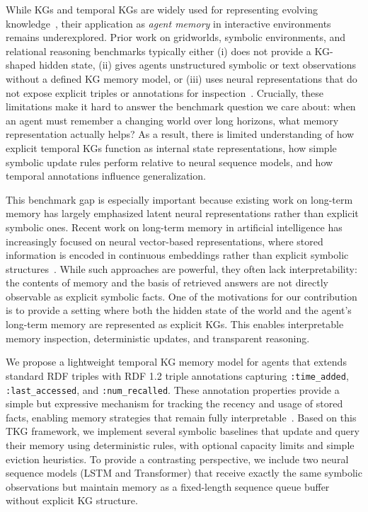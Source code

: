 \documentclass[Afour,sageh,times]{sagej}
\begin{document}
While KGs and temporal KGs are widely used for representing evolving
knowledge~\citep{Hogan_2021,dellaglio2017streamreasoning,moreau2012prov,DBLP:journals/corr/abs-1809-03202},
their application as \emph{agent memory} in interactive environments remains
underexplored. Prior work on gridworlds, symbolic environments, and relational reasoning
benchmarks typically either (i) does not provide a KG-shaped hidden state, (ii) gives
agents unstructured symbolic or text observations without a defined KG memory model, or
(iii) uses neural representations that do not expose explicit triples or annotations for
inspection~\citep{Cote2018TextWorld,Hausknecht2020Jericho,Ammanabrolu2020Graph,10.1609/aaai.v37i1.25075,battaglia2018relationalinductivebiasesdeep,zambaldi2018relationaldeepreinforcementlearning,graves2014neural,graves2016hybrid,Wayne2018MERLIN,DBLP:journals/corr/abs-1803-10122}.
Crucially, these limitations make it hard to answer the benchmark question we care
about: when an agent must remember a changing world over long horizons, what memory
representation actually helps? As a result, there is limited understanding of how
explicit temporal KGs function as internal state representations, how simple symbolic
update rules perform relative to neural sequence models, and how temporal annotations
influence generalization.

This benchmark gap is especially important because existing work on long-term memory has
largely emphasized latent neural representations rather than explicit symbolic ones.
Recent work on long-term memory in artificial intelligence has increasingly focused on
neural vector-based representations, where stored information is encoded in continuous
embeddings rather than explicit symbolic
structures~\citep{graves2014neural,graves2016hybrid,Wayne2018MERLIN,DBLP:journals/corr/abs-1803-10122,pritzel2017neuralepisodiccontrol,blundell2016modelfreeepisodiccontrol}.
While such approaches are powerful, they often lack interpretability: the contents of
memory and the basis of retrieved answers are not directly observable as explicit
symbolic facts. One of the motivations for our contribution is to provide a setting
where both the hidden state of the world and the agent’s long-term memory are
represented as explicit KGs. This enables interpretable memory inspection, deterministic
updates, and transparent reasoning.

We propose a lightweight temporal KG memory model for agents that extends standard RDF
triples with RDF 1.2 triple annotations capturing \texttt{:time\_added},
\texttt{:last\_accessed}, and \texttt{:num\_recalled}. These annotation properties provide a simple
but expressive mechanism for tracking the recency and usage of stored facts, enabling
memory strategies that remain fully interpretable~\citep{10.1145/2452376.2452478}. Based
on this TKG framework, we implement several symbolic baselines that update and query
their memory using deterministic rules, with optional capacity limits and simple
eviction heuristics. To provide a contrasting perspective, we include two neural
sequence models (LSTM and Transformer) that receive exactly the same symbolic
observations but maintain memory as a fixed-length sequence queue buffer without
explicit KG structure.
\end{document}
